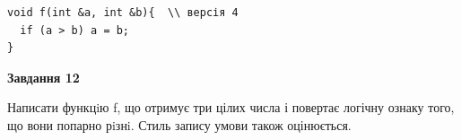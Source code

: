 \documentclass[12pt, ukrainian]{article}
\begin{document}
{\begin {large}
\begin{minipage}[t]{11.0cm}
\vspace{-8mm}\begin{verbatim}
void f(int &a, int &b){  \\ версія 4
  if (a > b) a = b;
}
\end{verbatim}



\begin{center}
\textbf{Завдання 12}
\end{center}

Написати функцiю f, що отримує три цілих числа і повертає логічну ознаку того, що вони попарно рiзнi. Стиль запису умови також оцінюється.\par

\end{minipage}

\end {large}}
\newpage
\end{document}
